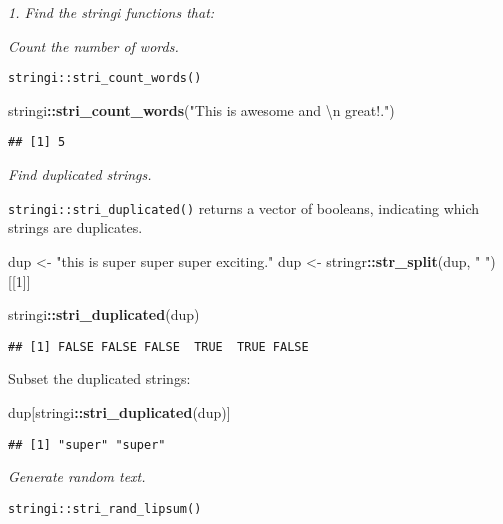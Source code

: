 \documentclass[]{article}
\newenvironment{Shaded}{\begin{snugshade}}{\end{snugshade}}
\newcommand{\KeywordTok}[1]{\textcolor[rgb]{0.13,0.29,0.53}{\textbf{#1}}}
\newcommand{\DecValTok}[1]{\textcolor[rgb]{0.00,0.00,0.81}{#1}}
\newcommand{\CharTok}[1]{\textcolor[rgb]{0.31,0.60,0.02}{#1}}
\newcommand{\StringTok}[1]{\textcolor[rgb]{0.31,0.60,0.02}{#1}}
\newcommand{\OperatorTok}[1]{\textcolor[rgb]{0.81,0.36,0.00}{\textbf{#1}}}
\newcommand{\NormalTok}[1]{#1}
\theoremstyle{definition}
\theoremstyle{definition}
\theoremstyle{definition}
\theoremstyle{remark}
\begin{document}
\emph{1. Find the stringi functions that:}

\emph{Count the number of words.}

\texttt{stringi::stri\_count\_words()}

\begin{Shaded}
\begin{Highlighting}[]
\NormalTok{stringi}\OperatorTok{::}\KeywordTok{stri_count_words}\NormalTok{(}\StringTok{"This is awesome and }\CharTok{\textbackslash{}n}\StringTok{ great!."}\NormalTok{)}
\end{Highlighting}
\end{Shaded}

\begin{verbatim}
## [1] 5
\end{verbatim}

\emph{Find duplicated strings.}

\texttt{stringi::stri\_duplicated()} returns a vector of booleans,
indicating which strings are duplicates.

\begin{Shaded}
\begin{Highlighting}[]
\NormalTok{dup <-}\StringTok{ "this is super super super exciting."}
\NormalTok{dup <-}\StringTok{ }\NormalTok{stringr}\OperatorTok{::}\KeywordTok{str_split}\NormalTok{(dup, }\StringTok{" "}\NormalTok{)[[}\DecValTok{1}\NormalTok{]]}

\NormalTok{stringi}\OperatorTok{::}\KeywordTok{stri_duplicated}\NormalTok{(dup)}
\end{Highlighting}
\end{Shaded}

\begin{verbatim}
## [1] FALSE FALSE FALSE  TRUE  TRUE FALSE
\end{verbatim}

Subset the duplicated strings:

\begin{Shaded}
\begin{Highlighting}[]
\NormalTok{dup[stringi}\OperatorTok{::}\KeywordTok{stri_duplicated}\NormalTok{(dup)]}
\end{Highlighting}
\end{Shaded}

\begin{verbatim}
## [1] "super" "super"
\end{verbatim}

\emph{Generate random text.}

\texttt{stringi::stri\_rand\_lipsum()}
\end{document}
